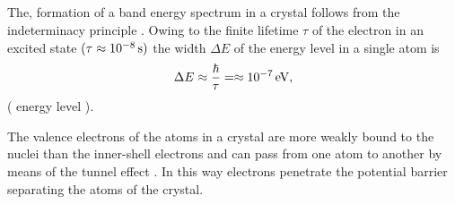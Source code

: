 \subsection{}\label{41.8.3} The, formation of a band energy spectrum in a crystal follows from the indeterminacy principle . Owing to the finite lifetime $\tau$ of the electron in an excited state $(\tau \approx \SI{d-8}{\second})$  the width $\Delta E$ of the energy level in a single atom is
\begin{equation*}%
\Delta E \approx \frac{\hbar}{\tau} = \approx \SI{d-7}{\electronvolt},
\end{equation*}
( energy level ).

The valence electrons  of the atoms in a crystal are more weakly bound to the nuclei than the inner-shell electrons and can pass from one atom to another by means of the tunnel effect . In this way electrons penetrate the potential barrier  separating the atoms of the crystal.


